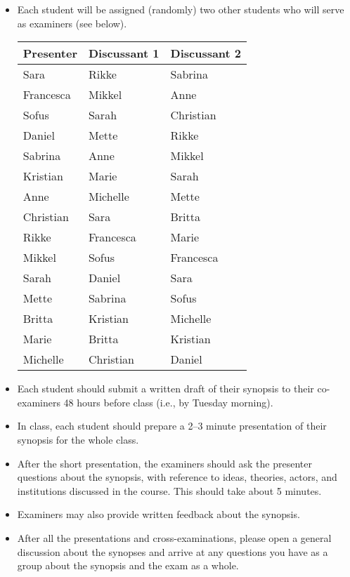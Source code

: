 \documentclass[12pt,a4paper]{article}
\begin{document}
\begin{itemize}
	\item Each student will be assigned (randomly) two other students who will serve as examiners (see below). 

\begin{center}
\begin{tabular}{lll} \toprule
	Presenter & Discussant 1 & Discussant 2 \\ \midrule
	Sara      & Rikke        & Sabrina      \\
	Francesca & Mikkel       & Anne         \\
	Sofus     & Sarah        & Christian    \\
	Daniel    & Mette        & Rikke        \\
	Sabrina   & Anne         & Mikkel       \\
	Kristian  & Marie        & Sarah        \\
	Anne      & Michelle     & Mette        \\
	Christian & Sara         & Britta       \\
	Rikke     & Francesca    & Marie        \\
	Mikkel    & Sofus        & Francesca    \\
	Sarah     & Daniel       & Sara         \\
	Mette     & Sabrina      & Sofus        \\
	Britta    & Kristian     & Michelle     \\
	Marie     & Britta       & Kristian     \\
	Michelle  & Christian    & Daniel       \\ \bottomrule
\end{tabular}
\end{center}


	\item Each student should submit a written draft of their synopsis to their co-examiners 48 hours before class (i.e., by Tuesday morning).
	\item In class, each student should prepare a 2--3 minute presentation of their synopsis for the whole class.
	\item After the short presentation, the examiners should ask the presenter questions about the synopsis, with reference to ideas, theories, actors, and institutions discussed in the course. This should take about 5 minutes.
	\item Examiners may also provide written feedback about the synopsis.
	\item After all the presentations and cross-examinations, please open a general discussion about the synopses and arrive at any questions you have as a group about the synopsis and the exam as a whole.
\end{itemize}
\end{document}
